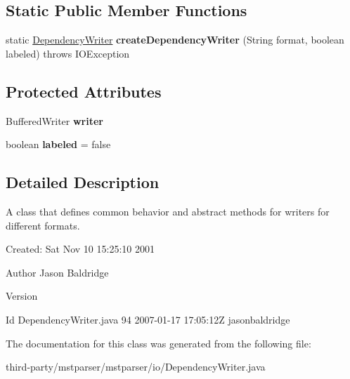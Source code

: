 \subsection*{Static Public Member Functions}
\begin{DoxyCompactItemize}
\item 
\hypertarget{classmstparser_1_1io_1_1DependencyWriter_a64285adfb4fc9445a14635544acf7cbd}{
static \hyperlink{classmstparser_1_1io_1_1DependencyWriter}{DependencyWriter} {\bfseries createDependencyWriter} (String format, boolean labeled)  throws IOException }
\label{classmstparser_1_1io_1_1DependencyWriter_a64285adfb4fc9445a14635544acf7cbd}

\end{DoxyCompactItemize}
\subsection*{Protected Attributes}
\begin{DoxyCompactItemize}
\item 
\hypertarget{classmstparser_1_1io_1_1DependencyWriter_a89fc1cedbe835a274ee6cfb851e3d302}{
BufferedWriter {\bfseries writer}}
\label{classmstparser_1_1io_1_1DependencyWriter_a89fc1cedbe835a274ee6cfb851e3d302}

\item 
\hypertarget{classmstparser_1_1io_1_1DependencyWriter_ac17a65c091653a0e892c258b483fbecb}{
boolean {\bfseries labeled} = false}
\label{classmstparser_1_1io_1_1DependencyWriter_ac17a65c091653a0e892c258b483fbecb}

\end{DoxyCompactItemize}


\subsection{Detailed Description}
A class that defines common behavior and abstract methods for writers for different formats.

Created: Sat Nov 10 15:25:10 2001 

\begin{DoxyAuthor}{Author}
Jason Baldridge 
\end{DoxyAuthor}
\begin{DoxyVersion}{Version}

\end{DoxyVersion}
\begin{DoxyParagraph}{Id}
DependencyWriter.java 94 2007-\/01-\/17 17:05:12Z jasonbaldridge 
\end{DoxyParagraph}


The documentation for this class was generated from the following file:\begin{DoxyCompactItemize}
\item 
third-\/party/mstparser/mstparser/io/DependencyWriter.java\end{DoxyCompactItemize}
